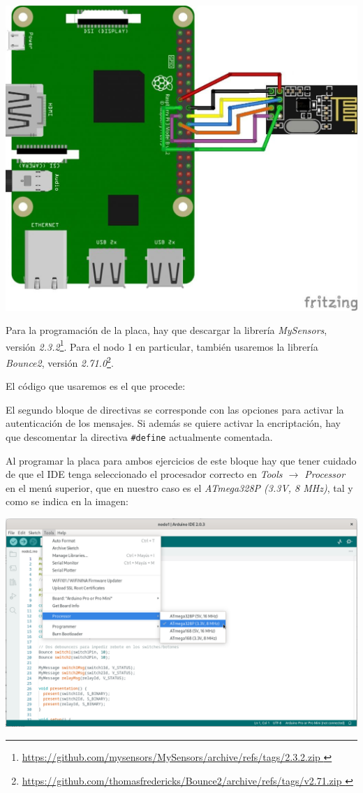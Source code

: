 \includegraphics[width=\linewidth]{rpi-nrf24l01-wiring.jpg}

Para la programación de la placa, hay que descargar la librería
\emph{MySensors}, versión \emph{2.3.2}\footnote{\url{
    https://github.com/mysensors/MySensors/archive/refs/tags/2.3.2.zip
}}. Para el nodo 1 en particular, también usaremos la librería \emph{Bounce2},
versión \emph{2.71.0}\footnote{\url{
    https://github.com/thomasfredericks/Bounce2/archive/refs/tags/v2.71.zip
}}.

El código que usaremos es el que procede:



El segundo bloque de directivas se corresponde con las opciones para activar la
autenticación de los mensajes. Si además se quiere activar la encriptación, hay
que descomentar la directiva \verb|#define| actualmente comentada.

Al programar la placa para ambos ejercicios de este bloque hay que tener
cuidado de que el IDE tenga seleccionado el procesador correcto en
\emph{Tools $\rightarrow$ Processor} en el menú superior, que en nuestro caso
es el \emph{ATmega328P (3.3V, 8 MHz)}, tal y como se indica en la imagen:

\includegraphics[width=\linewidth]{arduino-ide-processor.png}

